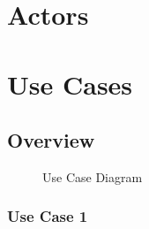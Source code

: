 \documentclass[12pt]{article}
\begin{document}
\section{Actors}

\section{Use Cases}

\subsection{Overview}
\pagebreak
\begin{figure}[htbp]
\caption{Use Case Diagram}
\label{fig:use-case-diagram}
\end{figure}

\subsubsection{Use Case 1} \label{uc:1}
\end{document}

